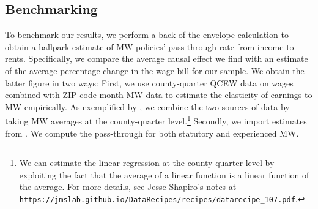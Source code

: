 \subsection{Benchmarking}\label{sec:discussion_benchmarking}
To benchmark our results, we perform a back of the envelope calculation to obtain a ballpark 
estimate of MW policies' pass-through rate from income to rents. Specifically, we compare the average 
causal effect we find with an estimate of the average percentage change in the wage 
bill for our sample. We obtain the latter figure in two ways: 
First, we use county-quarter QCEW data on wages 
combined with ZIP code-month MW data to estimate the elasticity of earnings to MW empirically. 
As exemplified by \textcite{gentzkow2015newspapers}, we combine the two sources of data by 
taking MW averages at the county-quarter level.\footnote{We can estimate the linear 
	regression at the county-quarter level by exploiting the fact that the average of a linear 
	function is a linear function of the average. For more details, see Jesse Shapiro's notes at \href{https://jmslab.github.io/DataRecipes/recipes/datarecipe_107.pdf}{\texttt{https://jmslab.github.io/DataRecipes/recipes/datarecipe\_107.pdf}}.} 
Secondly, we import estimates from \textcite{CegnizEtAl2019}. We compute the pass-through for
both statutory and experienced MW. 




